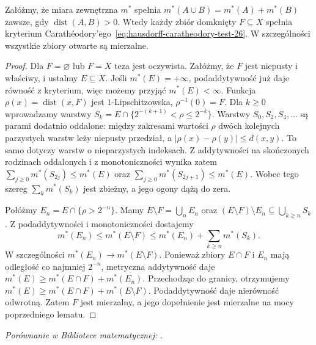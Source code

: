 \begin{lemat}
\label{lem:hausdorff-metric-open-26}
Załóżmy, że miara zewnętrzna $m^*$ spełnia
$m^*(A\cup B)=m^*(A)+m^*(B)$ zawsze, gdy
$\operatorname{dist}(A,B)>0$. Wtedy każdy zbiór
domknięty $F\subseteq X$ spełnia kryterium
Carathéodory'ego~\eqref{eq:hausdorff-caratheodory-test-26}.
W szczególności wszystkie zbiory otwarte są mierzalne.
\end{lemat}
\begin{proof}
Dla $F=\varnothing$ lub $F=X$ teza jest oczywista.
Załóżmy, że $F$ jest niepusty i właściwy, i ustalmy
$E\subseteq X$. Jeśli $m^*(E)=+\infty$,
podaddytywność już daje równość z kryterium,
więc możemy przyjąć $m^*(E)<\infty$.
Funkcja $\rho(x)=\operatorname{dist}(x,F)$
jest $1$-Lipschitzowska, $\rho^{-1}(0)=F$.
Dla $k\ge0$ wprowadzamy warstwy
$S_k=E\cap\{2^{-(k+1)}<\rho\leq2^{-k}\}$.
Warstwy $S_0,S_2,S_4,\ldots$ są parami dodatnio
oddalone: między zakresami wartości $\rho$ dwóch
kolejnych parzystych warstw leży niepusty przedział,
a $|\rho(x)-\rho(y)|\leq d(x,y)$.
To samo dotyczy warstw o nieparzystych indeksach.
Z addytywności na skończonych rodzinach oddalonych
i z monotoniczności wynika zatem
$\sum_{j\ge0}m^*(S_{2j})\leq m^*(E)$ oraz
$\sum_{j\ge0}m^*(S_{2j+1})\leq m^*(E)$.
Wobec tego szereg $\sum_km^*(S_k)$ jest zbieżny,
a jego ogony dążą do zera.

Połóżmy $E_n=E\cap\{\rho>2^{-n}\}$. Mamy
$E\setminus F=\bigcup_nE_n$ oraz
$(E\setminus F)\setminus E_n\subseteq\bigcup_{k\ge n}S_k$.
Z podaddytywności i monotoniczności dostajemy
\[
 m^*(E_n)\leq m^*(E\setminus F)
 \leq m^*(E_n)+\sum_{k\ge n}m^*(S_k).
\]
W szczególności $m^*(E_n)\to m^*(E\setminus F)$.
Ponieważ zbiory $E\cap F$ i $E_n$ mają odległość
co najmniej $2^{-n}$, metryczna addytywność daje
$m^*(E)\geq m^*(E\cap F)+m^*(E_n)$.
Przechodząc do granicy, otrzymujemy
$m^*(E)\geq m^*(E\cap F)+m^*(E\setminus F)$.
Podaddytywność daje nierówność odwrotną.
Zatem $F$ jest mierzalny, a jego dopełnienie
jest mierzalne na mocy poprzedniego lematu.
\end{proof}

\noindent\emph{Porównanie w Bibliotece matematycznej:} .

